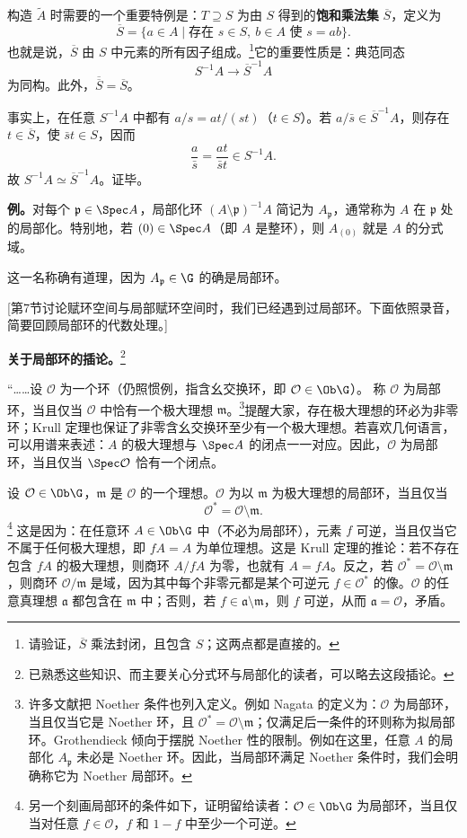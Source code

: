 构造 $\widetilde A$ 时需要的一个重要特例是：$T\supseteq S$ 为由 $S$ 得到的\textbf{饱和乘法集} $\overline S$，定义为
\[
\overline S=\{a\in A\mid\text{存在 }s\in S,\ b\in A\text{ 使 }s=ab\}.
\]
也就是说，$\overline S$ 由 $S$ 中元素的所有因子组成。\footnote{请验证，$\overline S$ 乘法封闭，且包含 $S$；这两点都是直接的。}它的重要性质是：典范同态
\[
S^{-1}A\longrightarrow\overline S^{-1}A
\]
为同构。此外，$\overline{\overline S}=\overline S$。

事实上，在任意 $S^{-1}A$ 中都有 $a/s=at/(st)$（$t\in S$）。若 $a/\bar s\in\overline S^{-1}A$，则存在 $t\in\overline S$，使 $\bar st\in S$，因而
\[
\frac a{\bar s}=\frac{at}{\bar st}\in S^{-1}A.
\]
故 $S^{-1}A\simeq\overline S^{-1}A$。证毕。

\textbf{例。}对每个 $\mathfrak p\in\Spec A$，局部化环 $(A\setminus\mathfrak p)^{-1}A$ 简记为 $A_{\mathfrak p}$，通常称为 $A$ 在 $\mathfrak p$ 处的局部化。特别地，若 $(0)\in\Spec A$（即 $A$ 是整环），则 $A_{(0)}$ 就是 $A$ 的分式域。

这一名称确有道理，因为 $A_{\mathfrak p}\in\G$ 的确是局部环。

[第7节讨论赋环空间与局部赋环空间时，我们已经遇到过局部环。下面依照录音，简要回顾局部环的代数处理。]

\textbf{关于局部环的插论。}\footnote{已熟悉这些知识、而主要关心分式环与局部化的读者，可以略去这段插论。}

“……设 $\mathcal O$ 为一个环（仍照惯例，指含幺交换环，即 $\mathcal O\in\Ob\G$）。
称 $\mathcal O$ 为局部环，当且仅当 $\mathcal O$ 中恰有一个极大理想 $\mathfrak m$。\footnote{许多文献把 Noether 条件也列入定义。例如 Nagata 的定义为：$\mathcal O$ 为局部环，当且仅当它是 Noether 环，且 $\mathcal O^*=\mathcal O\setminus\mathfrak m$；仅满足后一条件的环则称为拟局部环。Grothendieck 倾向于摆脱 Noether 性的限制。例如在这里，任意 $A$ 的局部化 $A_{\mathfrak p}$ 未必是 Noether 环。因此，当局部环满足 Noether 条件时，我们会明确称它为 Noether 局部环。}提醒大家，存在极大理想的环必为非零环；Krull 定理也保证了非零含幺交换环至少有一个极大理想。若喜欢几何语言，可以用谱来表述：$A$ 的极大理想与 $\Spec A$ 的闭点一一对应。因此，$\mathcal O$ 为局部环，当且仅当 $\Spec\mathcal O$ 恰有一个闭点。

设 $\mathcal O\in\Ob\G$，$\mathfrak m$ 是 $\mathcal O$ 的一个理想。$\mathcal O$ 为以 $\mathfrak m$ 为极大理想的局部环，当且仅当
\[
\mathcal O^*=\mathcal O\setminus\mathfrak m.
\]
\footnote{另一个刻画局部环的条件如下，证明留给读者：$\mathcal O\in\Ob\G$ 为局部环，当且仅当对任意 $f\in\mathcal O$，$f$ 和 $1-f$ 中至少一个可逆。}
这是因为：在任意环 $A\in\Ob\G$ 中（不必为局部环），元素 $f$ 可逆，当且仅当它不属于任何极大理想，即 $fA=A$ 为单位理想。这是 Krull 定理的推论：若不存在包含 $fA$ 的极大理想，则商环 $A/fA$ 为零，也就有 $A=fA$。反之，若 $\mathcal O^*=\mathcal O\setminus\mathfrak m$，则商环 $\mathcal O/\mathfrak m$ 是域，因为其中每个非零元都是某个可逆元 $f\in\mathcal O^*$ 的像。$\mathcal O$ 的任意真理想 $\mathfrak a$ 都包含在 $\mathfrak m$ 中；否则，若 $f\in\mathfrak a\setminus\mathfrak m$，则 $f$ 可逆，从而 $\mathfrak a=\mathcal O$，矛盾。

